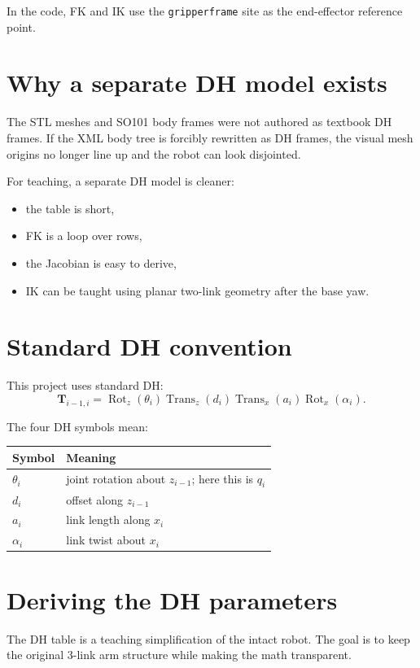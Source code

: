 \documentclass[11pt]{article}
\newcommand{\T}{\mathbf{T}}
\newcommand{\Rotz}{\operatorname{Rot}_z}
\newcommand{\Rotx}{\operatorname{Rot}_x}
\newcommand{\Transz}{\operatorname{Trans}_z}
\newcommand{\Transx}{\operatorname{Trans}_x}
\begin{document}
In the code, FK and IK use the \texttt{gripperframe} site as the end-effector
reference point.

\section{Why a separate DH model exists}
The STL meshes and SO101 body frames were not authored as textbook DH frames.
If the XML body tree is forcibly rewritten as DH frames, the visual mesh origins
no longer line up and the robot can look disjointed.

For teaching, a separate DH model is cleaner:
\begin{itemize}[leftmargin=1.3em]
  \item the table is short,
  \item FK is a loop over rows,
  \item the Jacobian is easy to derive,
  \item IK can be taught using planar two-link geometry after the base yaw.
\end{itemize}

\section{Standard DH convention}
This project uses standard DH:
\[
\T_{i-1,i}
=
\Rotz(\theta_i)\Transz(d_i)\Transx(a_i)\Rotx(\alpha_i).
\]

The four DH symbols mean:
\begin{center}
\begin{tabular}{@{}ll@{}}
\toprule
Symbol & Meaning \\
\midrule
\(\theta_i\) & joint rotation about \(z_{i-1}\); here this is \(q_i\) \\
\(d_i\) & offset along \(z_{i-1}\) \\
\(a_i\) & link length along \(x_i\) \\
\(\alpha_i\) & link twist about \(x_i\) \\
\bottomrule
\end{tabular}
\end{center}

\section{Deriving the DH parameters}
The DH table is a teaching simplification of the intact robot. The goal is to
keep the original 3-link arm structure while making the math transparent.
\end{document}
